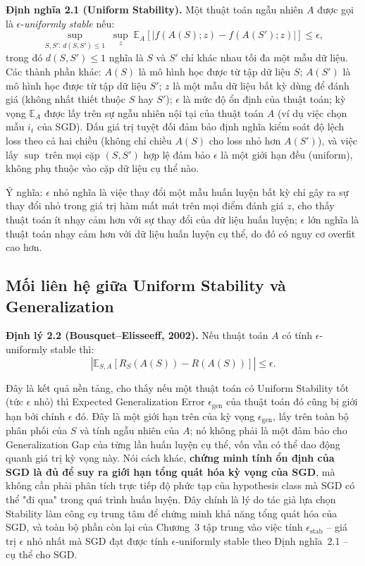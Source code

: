 \textbf{Định nghĩa 2.1 (Uniform Stability).} Một thuật toán ngẫu nhiên $A$ được gọi là $\epsilon$-\textit{uniformly stable} nếu:
\[
\boxed{
\sup_{S, S':\, d(S,S') \le 1} \; \sup_{z} \; \mathbb{E}_A\left[\left|f(A(S); z) - f(A(S'); z)\right|\right] \leq \epsilon,
}
\]
trong đó $d(S,S') \le 1$ nghĩa là $S$ và $S'$ chỉ khác nhau tối đa một mẫu dữ liệu. Các thành phần khác: $A(S)$ là mô hình học được từ tập dữ liệu $S$; $A(S')$ là mô hình học được từ tập dữ liệu $S'$; $z$ là một mẫu dữ liệu bất kỳ dùng để đánh giá (không nhất thiết thuộc $S$ hay $S'$); $\epsilon$ là mức độ ổn định của thuật toán; kỳ vọng $\mathbb{E}_A$ được lấy trên sự ngẫu nhiên nội tại của thuật toán $A$ (ví dụ việc chọn mẫu $i_t$ của SGD). Dấu giá trị tuyệt đối đảm bảo định nghĩa kiểm soát độ lệch loss theo cả hai chiều (không chỉ chiều $A(S)$ cho loss nhỏ hơn $A(S')$), và việc lấy $\sup$ trên mọi cặp $(S,S')$ hợp lệ đảm bảo $\epsilon$ là một giới hạn đều (uniform), không phụ thuộc vào cặp dữ liệu cụ thể nào.

Ý nghĩa: $\epsilon$ nhỏ nghĩa là việc thay đổi một mẫu huấn luyện bất kỳ chỉ gây ra sự thay đổi nhỏ trong giá trị hàm mất mát trên mọi điểm đánh giá $z$, cho thấy thuật toán ít nhạy cảm hơn với sự thay đổi của dữ liệu huấn luyện; $\epsilon$ lớn nghĩa là thuật toán nhạy cảm hơn với dữ liệu huấn luyện cụ thể, do đó có nguy cơ overfit cao hơn.

\subsection{Mối liên hệ giữa Uniform Stability và Generalization}

\textbf{Định lý 2.2 (Bousquet--Elisseeff, 2002).} Nếu thuật toán $A$ có tính $\epsilon$-uniformly stable thì:
\[
\boxed{
\left|\mathbb{E}_{S, A}\left[R_S(A(S)) - R(A(S))\right]\right| \leq \epsilon.
}
\]

Đây là kết quả nền tảng, cho thấy nếu một thuật toán có Uniform Stability tốt (tức $\epsilon$ nhỏ) thì Expected Generalization Error $\epsilon_{\mathrm{gen}}$ của thuật toán đó cũng bị giới hạn bởi chính $\epsilon$ đó. Đây là một giới hạn trên của kỳ vọng $\epsilon_{\mathrm{gen}}$, lấy trên toàn bộ phân phối của $S$ và tính ngẫu nhiên của $A$; nó không phải là một đảm bảo cho Generalization Gap của từng lần huấn luyện cụ thể, vốn vẫn có thể dao động quanh giá trị kỳ vọng này. Nói cách khác, \textbf{chứng minh tính ổn định của SGD là đủ để suy ra giới hạn tổng quát hóa kỳ vọng của SGD}, mà không cần phải phân tích trực tiếp độ phức tạp của hypothesis class mà SGD có thể "đi qua" trong quá trình huấn luyện. Đây chính là lý do tác giả lựa chọn Stability làm công cụ trung tâm để chứng minh khả năng tổng quát hóa của SGD, và toàn bộ phần còn lại của Chương~3 tập trung vào việc tính $\epsilon_{\mathrm{stab}}$ -- giá trị $\epsilon$ nhỏ nhất mà SGD đạt được tính $\epsilon$-uniformly stable theo Định nghĩa~2.1 -- cụ thể cho SGD.

